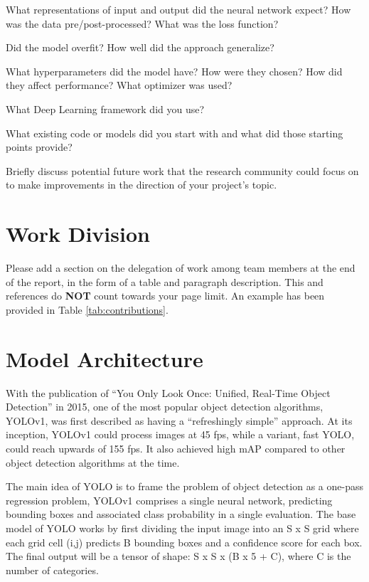 \documentclass[10pt,twocolumn,letterpaper]{article}
\begin{document}
What representations of input and output did the neural network expect? How was the data pre/post-processed?
What was the loss function? 

Did the model overfit? How well did the approach generalize? 

What hyperparameters did the model have? How were they chosen? How did they affect performance? What optimizer was used? 

What Deep Learning framework did you use? 

What existing code or models did you start with and what did those starting points provide? 

Briefly discuss potential future work that the research community could focus on to make improvements in the direction of your project's topic.



\section{Work Division}

Please add a section on the delegation of work among team members at the end of the report, in the form of a table and paragraph description. This and references do \textbf{NOT} count towards your page limit. An example has been provided in Table \ref{tab:contributions}.

\newpage
\newpage

\section{Model Architecture}

With the publication of “You Only Look Once: Unified, Real-Time Object Detection” in 2015, one of the most popular object detection algorithms, YOLOv1, was first described as having a “refreshingly simple” approach. At its inception, YOLOv1 could process images at 45 fps, while a variant, fast YOLO, could reach upwards of 155 fps. It also achieved high mAP compared to other object detection algorithms at the time. 

The main idea of YOLO is to frame the problem of object detection as a one-pass regression problem, YOLOv1 comprises a single neural network, predicting bounding boxes and associated class probability in a single evaluation. The base model of YOLO works by first dividing the input image into an S x S grid where each grid cell (i,j) predicts B bounding boxes and a confidence score for each box. The final output will be a tensor of shape: S x S x (B x 5 + C), where C is the number of categories.
\end{document}
